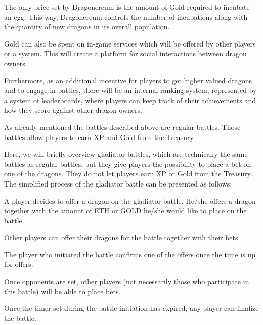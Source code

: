 \documentclass[12pt]{article}
\begin{document}
The only price set by Dragonereum is the amount of Gold required to incubate an egg. This way, Dragonereum controls the number of incubations along with the quantity of new dragons in its overall population.\par

Gold can also be spent on in-game services which will be offered by other players or a system. This will create a platform for social interactions between dragon owners.\par

Furthermore, as an additional incentive for players to get higher valued dragons and to engage in battles, there will be an internal ranking system, represented by a system of leaderboards, where players can keep track of their achievements and how they score against other dragon owners.\par

As already mentioned the battles described above are regular battles. Those battles allow players to earn XP and Gold from the Treasury.\par

Here, we will briefly overview gladiator battles, which are technically the same battles as regular battles, but they give players the possibility to place a bet on one of the dragons. They do not let players earn XP or Gold from the Treasury. The simplified process of the gladiator battle can be presented as follows:\par


\begin{itemize}
  \begin{samepage}
    \item A player decides to offer a dragon on the gladiator battle. He/she offers a dragon together with the amount of ETH or GOLD he/she would like to place on the battle.
    \item Other players can offer their dragons for the battle together with their bets.
    \item The player who initiated the battle confirms one of the offers once the time is up for offers.
    \item Once opponents are set, other players (not necessarily those who participate in this battle) will be able to place bets.
    \item Once the timer set during the battle initiation has expired, any player can finalize the battle.
  \end{samepage}
\end{itemize}
\end{document}
